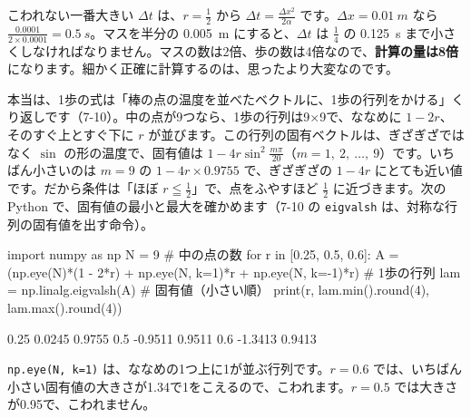 こわれない一番大きい $\Delta t$ は、$r=\frac12$ から $\Delta t=\tfrac{\Delta x^2}{2\alpha}$ です。$\Delta x=\qty{0.01}{m}$ なら $\tfrac{0.0001}{2\times0.0001}=\qty{0.5}{s}$。マスを半分の \qty{0.005}{m} にすると、$\Delta t$ は $\frac14$ の \qty{0.125}{s} まで小さくしなければなりません。マスの数は2倍、歩の数は4倍なので、\textbf{計算の量は8倍}になります。細かく正確に計算するのは、思ったより大変なのです。

\begin{seikaku}
本当は、1歩の式は「棒の点の温度を並べたベクトルに、1歩の行列をかける」くり返しです（7-10）。中の点が9つなら、1歩の行列は9×9で、ななめに $1-2r$、そのすぐ上とすぐ下に $r$ が並びます。この行列の固有ベクトルは、ぎざぎざではなく $\sin$ の形の温度で、固有値は $1-4r\sin^2\tfrac{m\pi}{20}$（$m=1,\ 2,\ \ldots,\ 9$）です。いちばん小さいのは $m=9$ の $1-4r\times0.9755$ で、ぎざぎざの $1-4r$ にとても近い値です。だから条件は「ほぼ $r\leqq\frac12$」で、点をふやすほど $\frac12$ に近づきます。次の Python で、固有値の最小と最大を確かめます（7-10 の \texttt{eigvalsh} は、対称な行列の固有値を出す命令）。
\end{seikaku}
\begin{bkcode}[Python]
import numpy as np
N = 9                                \# 中の点の数
for r in [0.25, 0.5, 0.6]:
    A = (np.eye(N)*(1 - 2*r) + np.eye(N, k=1)*r
         + np.eye(N, k=-1)*r)        \# 1歩の行列
    lam = np.linalg.eigvalsh(A)      \# 固有値（小さい順）
    print(r, lam.min().round(4), lam.max().round(4))
\end{bkcode}
\begin{bkcodeout}[実行結果]
0.25 0.0245 0.9755
0.5 -0.9511 0.9511
0.6 -1.3413 0.9413
\end{bkcodeout}
\texttt{np.eye(N, k=1)} は、ななめの1つ上に1が並ぶ行列です。$r=0.6$ では、いちばん小さい固有値の大きさが1.34で1をこえるので、こわれます。$r=0.5$ では大きさが0.95で、こわれません。

\bkkokomade[熱の表計算は「となりとの差の $r$ 倍をたす」のくり返しです。両はしは境界条件、はじめは初期条件で決めます。$r=\frac{\alpha\Delta t}{\Delta x^2}$ が $\frac12$ をこえると、ぎざぎざが育って計算がこわれます。この先は、マスを細かくした先の「偏微分方程式」を作ります。]



